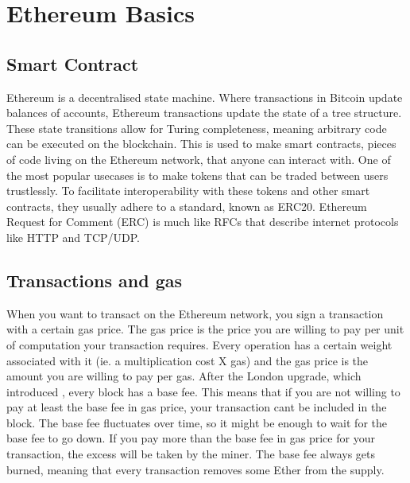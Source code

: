 \section{Ethereum Basics}

\subsection{Smart Contract}
Ethereum \cite{ethereumyellow} is a decentralised state machine. Where transactions in Bitcoin update balances of accounts, Ethereum transactions update the state of a tree structure. These state transitions allow for Turing completeness, meaning arbitrary code can be executed on the blockchain. This is used to make smart contracts, pieces of code living on the Ethereum network, that anyone can interact with. One of the most popular usecases is to make tokens that can be traded between users trustlessly. To facilitate interoperability with these tokens and other smart contracts, they usually adhere to a standard, known as ERC20. Ethereum Request for Comment (ERC) \cite{erc} is much like RFCs \cite{httprfc} that describe internet protocols like HTTP and TCP/UDP. 

\subsection{Transactions and gas}

When you want to transact on the Ethereum network, you sign a transaction with a certain gas price. The gas price is the price you are willing to pay per unit of computation your transaction requires. Every operation has a certain weight associated with it (ie. a multiplication cost X gas) and the gas price is the amount you are willing to pay per gas.
After the London upgrade, which introduced \cite{eip1559}, every block has a base fee. This means that if you are not willing to pay at least the base fee in gas price, your transaction cant be included in the block. The base fee fluctuates over time, so it might be enough to wait for the base fee to go down. If you pay more than the base fee in gas price for your transaction, the excess will be taken by the miner. The base fee always gets burned, meaning that every transaction removes some Ether from the supply. 

